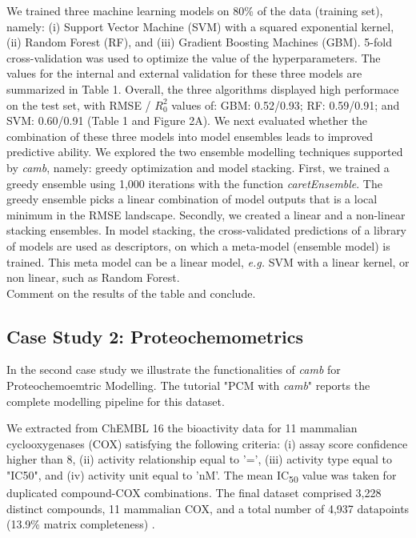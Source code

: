 \documentclass[twoside,a4wide,10pt]{article}
\begin{document}
We trained three machine learning models on 80\% of the
data (training set), namely: 
(i) Support Vector Machine (SVM) with a squared exponential kernel,
(ii) Random Forest (RF), and
(iii) Gradient Boosting Machines (GBM).
5-fold cross-validation was used to optimize the value of the hyperparameters.
The values for the internal and external validation for these three models are summarized in Table 1.
Overall, the three algorithms displayed high performace on the test set,
with RMSE / $R^{2}_{0}$ values of:  GBM: 0.52/0.93; RF: 0.59/0.91; and SVM: 0.60/0.91  (Table 1 and Figure 2A). %
We next evaluated whether the combination of these three models
into model ensembles leads to improved predictive ability. 
We explored the two ensemble modelling techniques supported by {\it camb},
namely: greedy optimization and model stacking.
First, we trained a greedy ensemble using 1,000 iterations with the function {\it caretEnsemble}. 
The greedy ensemble picks a linear combination of model outputs that is a local minimum in the RMSE landscape. %
Secondly, we created a linear and a non-linear stacking ensembles.
In model stacking, the cross-validated predictions of a library of models are used as descriptors,
on which a meta-model (ensemble model) is trained.
This meta model can be a linear model, {\it e.g.} SVM with a linear kernel,
or non linear, such as Random Forest.\\

Comment on the results of the table and conclude. %



\subsection{Case Study 2: Proteochemometrics}

In the second case study we illustrate the functionalities of {\it camb} for
Proteochemoemtric Modelling.
The tutorial "PCM with {\it camb}" reports the complete modelling pipeline for this dataset.

We extracted from ChEMBL 16 \citep{chembl} the bioactivity data for 11 mammalian cyclooxygenases (COX)
satisfying the following criteria:
(i) assay score confidence higher than 8,
(ii) activity relationship equal to '=',
(iii) activity type equal to "IC50",
and (iv) activity unit equal to 'nM'.
The mean IC\textsubscript{50} value was taken for duplicated compound-COX combinations.
The final dataset comprised 3,228 distinct compounds, 11 mammalian COX,  
and a total number of 4,937 datapoints (13.9\% matrix completeness) \citep{cortesCOX}.
\end{document}
